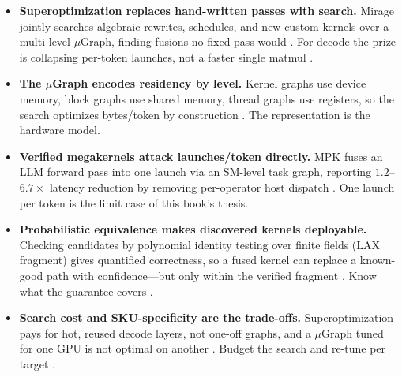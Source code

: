 \begin{itemize}
\item \textbf{Superoptimization replaces hand-written passes with search.}
Mirage jointly searches algebraic rewrites, schedules, and new custom kernels over a multi-level $\mu$Graph, finding fusions no fixed pass would \citep{wu2024mirage}. For decode the prize is collapsing per-token launches, not a faster single matmul \citep{taxbreak2026}.

\item \textbf{The $\mu$Graph encodes residency by level.}
Kernel graphs use device memory, block graphs use shared memory, thread graphs use registers, so the search optimizes bytes/token by construction \citep{wu2024mirage,memoryfloor2026}. The representation is the hardware model.

\item \textbf{Verified megakernels attack launches/token directly.}
MPK fuses an LLM forward pass into one launch via an SM-level task graph, reporting $1.2$--$6.7\times$ latency reduction by removing per-operator host dispatch \citep{mpk2025,nvidia2024cudagraphs}. One launch per token is the limit case of this book's thesis.

\item \textbf{Probabilistic equivalence makes discovered kernels deployable.}
Checking candidates by polynomial identity testing over finite fields (LAX fragment) gives quantified correctness, so a fused kernel can replace a known-good path with confidence---but only within the verified fragment \citep{wu2024mirage}. Know what the guarantee covers \citep{patel2025llminference}.

\item \textbf{Search cost and SKU-specificity are the trade-offs.}
Superoptimization pays for hot, reused decode layers, not one-off graphs, and a $\mu$Graph tuned for one GPU is not optimal on another \citep{wu2024mirage,nvidia2022hopper}. Budget the search and re-tune per target \citep{kwon2023vllm}.
\end{itemize}

